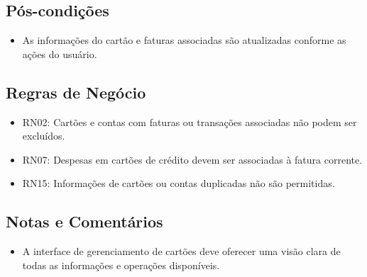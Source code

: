 \subsection*{Pós-condições}
\begin{addmargin}[1.5cm]{0cm}
    \begin{itemize}
        \item As informações do cartão e faturas associadas são atualizadas conforme as ações do usuário.
    \end{itemize}
\end{addmargin}

\subsection*{Regras de Negócio}
\begin{addmargin}[1.5cm]{0cm}
    \begin{itemize}
        \item RN02: Cartões e contas com faturas ou transações associadas não podem ser excluídos.
        \item RN07: Despesas em cartões de crédito devem ser associadas à fatura corrente.
        \item RN15: Informações de cartões ou contas duplicadas não são permitidas.
    \end{itemize}
\end{addmargin}

\subsection*{Notas e Comentários}
\begin{addmargin}[1.5cm]{0cm}
    \begin{itemize}
        \item A interface de gerenciamento de cartões deve oferecer uma visão clara de todas as informações e operações disponíveis.
    \end{itemize}
\end{addmargin}
